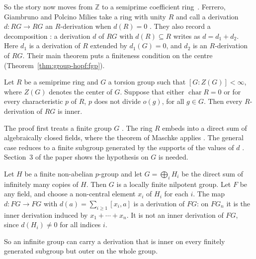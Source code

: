 So the story now moves from $\mathbb{Z}$ to a semiprime coefficient ring~\cite[p.~434]{FerreroGiambrunoPolcinoMilies1995}.
Ferrero, Giambruno and Polcino Milies take a ring with unity $R$ and call a
derivation $d\colon RG\to RG$ an $R$-derivation when $d(R)=0$
\cite[p.~434]{FerreroGiambrunoPolcinoMilies1995}. They also record a
decomposition \cite[p.~434]{FerreroGiambrunoPolcinoMilies1995}: a derivation
$d$ of $RG$ with $d(R)\subseteq R$ writes as $d=d_1+d_2$. Here $d_1$ is a
derivation of $R$ extended by $d_1(G)=0$, and $d_2$ is an $R$-derivation of
$RG$. Their main theorem puts a finiteness condition on the centre
(Theorem~\ref{thm:group-hopf:fgp}).

\begin{theorem}\label{thm:group-hopf:fgp}
Let $R$ be a semiprime ring and $G$ a torsion group such that $[G:Z(G)]<\infty$,
where $Z(G)$ denotes the center of $G$. Suppose that either $\operatorname{char}R=0$
or for every characteristic $p$ of $R$, $p$ does not divide $o(g)$, for all $g\in G$.
Then every $R$-derivation of $RG$ is inner.
\end{theorem}

The proof first treats a finite group $G$
\cite[pp.~434--436]{FerreroGiambrunoPolcinoMilies1995}. The ring $R$ embeds
into a direct sum of algebraically closed fields, where the theorem of Maschke
applies \cite[p.~435]{FerreroGiambrunoPolcinoMilies1995}. The general case
reduces to a finite subgroup generated by the supports of the values of $d$
\cite[pp.~434--436]{FerreroGiambrunoPolcinoMilies1995}. Section~3 of the paper
shows the hypothesis on $G$ is needed.

\begin{example}\label{ex:group-hopf:outer}
Let $H$ be a finite non-abelian $p$-group and let $G=\bigoplus_i H_i$ be the direct
sum of infinitely many copies of $H$. Then $G$ is a locally finite nilpotent group.
Let $F$ be any field, and choose a non-central element $x_i$ of $H_i$ for each $i$.
The map $d\colon FG\to FG$ with $d(a)=\sum_{i\ge1}[x_i,a]$ is a derivation of $FG$:
on $FG_n$ it is the inner derivation induced by $x_1+\cdots+x_n$. It is not an inner
derivation of $FG$, since $d(H_i)\neq0$ for all indices $i$.
\end{example}

So an infinite group can carry a derivation that is inner on every finitely
generated subgroup but outer on the whole group.

